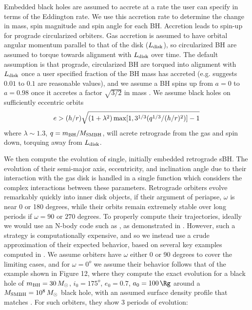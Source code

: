 Embedded black holes are assumed to accrete at a rate the user can specify in terms of the Eddington rate.
We use this accretion rate to determine the change in mass, spin magnitude and spin angle for each BH.
Accretion leads to spin-up for prograde circularized orbiters. Gas accretion is assumed to have orbital angular momentum parallel to that of the disk ($L_{\rm disk}$), so circularized BH are assumed to torque towards alignment with $L_{\rm disk}$ over time.
The default assumption is that prograde, circularized BH are torqued into alignment with $L_{\rm disk}$ once a user specified fraction of the BH mass has accreted (e.g. \citealt{Bogdanovic+07} suggests $0.01$ to $0.1$ are reasonable values), and we assume a BH spins up from $a=0$ to $a=0.98$ once it accretes a factor $\sqrt{3/2}$ in mass \citep{Bardeen70}.
We assume black holes on sufficiently eccentric orbits \citep{Chen+22}
 \begin{equation}
     e > (h/r) \sqrt{(1+\lambda^{2})\,{\rm max}[1,3^{1/3}(q^{1/3}/(h/r)^{2})]-1}
 \end{equation}
 where $\lambda \sim 1.3$, $q=m_{\rm BH}/M_{\rm SMBH}$, will acrete retrograde from the gas and spin down, torquing away from $L_{\rm disk}$. 

We then compute the evolution of single, initially embedded retrograde sBH.
The evolution of their semi-major axis, eccentricity, and inclination angle due to their interaction with the gas disk is handled in a single function which considers the complex interactions between these parameters.
Retrograde orbiters evolve remarkably quickly into inner disk objects, if their argument of periapse, $\omega$ is near 0 or 180 degrees, while their orbits remain extremely stable over long periods if $\omega=90$ or $270$ degrees.
To properly compute their trajectories, ideally we would use an N-body code such as , as demonstrated in \cite{WangZhuLin24}.
However, such a strategy is computationally expensive, and so we instead use a crude approximation of their expected behavior, based on several key examples computed in \cite{WangZhuLin24}.
We assume orbiters have $\omega$ either 0 or 90 degrees to cover the limiting cases, and for $\omega=0^{o}$ we assume their behavior follows that of the example shown in \cite{WangZhuLin24} Figure 12, where they compute the exact evolution for a black hole of $m_{\rm BH} = 30\,M_{\odot}$, $i_0=175^{o}$, $e_0=0.7$, $a_0=100\,\Rg$ around a $M_{\rm SMBH}=10^8 \,M_{\odot}$ black hole, with an assumed surface density profile that matches \cite{SirkoGoodman03}.
For such orbiters, they show 3 periods of evolution:

